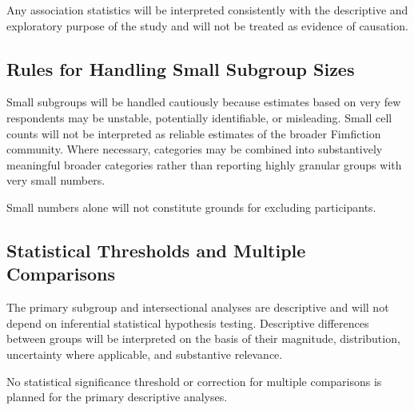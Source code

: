 Any association statistics will be interpreted consistently with the descriptive and exploratory purpose of the study and will not be treated as evidence of causation.


\subsection{Rules for Handling Small Subgroup Sizes}

Small subgroups will be handled cautiously because estimates based on very few respondents may be unstable, potentially identifiable, or misleading. Small cell counts will not be interpreted as reliable estimates of the broader Fimfiction community. Where necessary, categories may be combined into substantively meaningful broader categories rather than reporting highly granular groups with very small numbers.

Small numbers alone will not constitute grounds for excluding participants.


\subsection{Statistical Thresholds and Multiple Comparisons}

The primary subgroup and intersectional analyses are descriptive and will not depend on inferential statistical hypothesis testing. Descriptive differences between groups will be interpreted on the basis of their magnitude, distribution, uncertainty where applicable, and substantive relevance.

No statistical significance threshold or correction for multiple comparisons is planned for the primary descriptive analyses.

